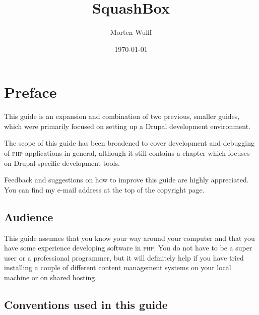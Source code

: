 \documentclass[draft,ebook,10pt,twoside,openright]{memoir}
\title{SquashBox}
\author{Morten Wulff}
\date{\today}
\begin{document}
\frontmatter

\squashboxhalftitlepage{\thetitle}



\begingroup
{}
\tableofcontents*
\endgroup

\chapter{Preface}

This guide is an expansion and combination of two previous, smaller guides, which were primarily focused on setting up a Drupal development environment.

The scope of this guide has been broadened to cover development and debugging of \textsc{php} applications in general, although it still contains a chapter which focuses on Drupal-specific development tools.

Feedback and suggestions on how to improve this guide are highly appreciated. You can find my e-mail address at the top of the copyright page.


\section*{Audience}

This guide assumes that you know your way around your computer and that you have some experience developing software in \textsc{php}. You do not have to be a super user or a professional programmer, but it will definitely help if you have tried installing a couple of different content management systems on your local machine or on shared hosting.


\section*{Conventions used in this guide}

\begingroup
\setlength{\parindent}{0pt}
\end{document}
